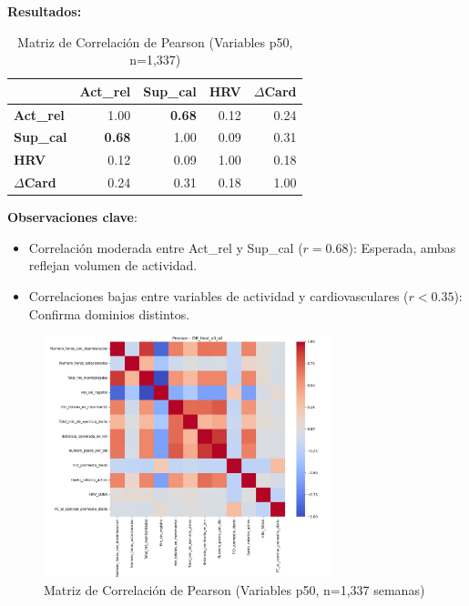 \documentclass[12pt,letterpaper,twoside]{report}
\begin{document}
\begin{calculobox}
\textbf{Resultados:}

\begin{table}[H]
\centering
\caption{Matriz de Correlación de Pearson (Variables p50, n=1,337)}
\label{tab:correlation_matrix}
\begin{tabular}{@{}lrrrr@{}}
\toprule
 & \textbf{Act\_rel} & \textbf{Sup\_cal} & \textbf{HRV} & \textbf{$\Delta$Card} \\
\midrule
\textbf{Act\_rel}     & 1.00 & \textbf{0.68} & 0.12 & 0.24 \\
\textbf{Sup\_cal}     & \textbf{0.68} & 1.00 & 0.09 & 0.31 \\
\textbf{HRV}          & 0.12 & 0.09 & 1.00 & 0.18 \\
\textbf{$\Delta$Card} & 0.24 & 0.31 & 0.18 & 1.00 \\
\bottomrule
\end{tabular}
\end{table}

\textbf{Observaciones clave}:
\begin{itemize}[noitemsep]
    \item Correlación moderada entre Act\_rel y Sup\_cal ($r=0.68$): Esperada, ambas reflejan volumen de actividad.
    \item Correlaciones bajas entre variables de actividad y cardiovasculares ($r < 0.35$): Confirma dominios distintos.
\end{itemize}
\end{calculobox}

\begin{figure}[H]
\centering
\includegraphics[width=0.75\textwidth]{figuras/DB_final_v3_u1_heatmap_pearson.png}
\caption{Matriz de Correlación de Pearson (Variables p50, n=1,337 semanas)}
\label{fig:correlation_heatmap}
\end{figure}
\end{document}
